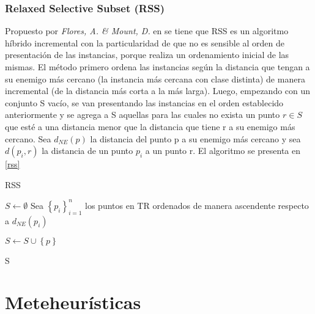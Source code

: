 \subsubsection{Relaxed Selective Subset (RSS)}

 Propuesto por \emph{Flores, A. \& Mount, D.} en \cite{floresnearest} se tiene que RSS es un algoritmo híbrido incremental con la particularidad de que no es sensible al orden de presentación de las instancias, porque realiza un ordenamiento inicial de las mismas. El método primero ordena las instancias según la distancia que tengan a su enemigo más cercano (la instancia más cercana con clase distinta) de manera incremental (de la distancia más corta a la más larga). Luego, empezando con un conjunto S vacío, se van presentando las instancias en el orden establecido anteriormente y se agrega a S aquellas para las cuales no exista un punto $r \in S$ que esté a una distancia menor que la distancia que tiene r a su enemigo más cercano. Sea $d_{NE}(p)$ la distancia del punto p a su enemigo más cercano y sea $d(p_i,r)$ la distancia de un punto $p_i$ a un punto r. El algoritmo se presenta en \ref{rss}

\begin{algorithm}
\caption{RSS}
\label{rss}
\begin{algorithmic}[1]


\State $S \gets \emptyset$
\State Sea $\left\{p_i\right\}_{i=1}^n$ los puntos en TR ordenados de manera ascendente respecto a $d_{NE}(p_i)$

		\State $S \gets S \cup \left\{p\right\}$
	\EndIf
\EndFor

\State \Return S

\end{algorithmic}
\end{algorithm}


\section{Meteheurísticas}

